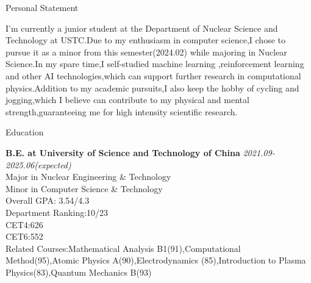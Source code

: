 \documentclass[
	11pt, %
]{resume} %
\begin{document}
\begin{rSection}{Personal Statement}

I'm currently a junior student at the Department of Nuclear Science and Technology at USTC.Due to 
my enthusiasm in computer science,I chose to pursue it as a minor from this
semester(2024.02) while majoring in Nuclear Science.In my spare time,I 
self-studied machine learning ,reinforcement learning and other AI technologies,which can 
support further research in computational physics.Addition to my academic pursuits,I also keep the hobby of cycling and 
jogging,which I believe can contribute to my physical and mental strength,guaranteeing me 
for high intensity scientific research.
\end{rSection}


\begin{rSection}{Education}
	
	\textbf{B.E. at University of Science and Technology of China} \hfill \textit{2021.09-2025.06(expected)} \\ 
	Major in Nuclear Engineering \& Technology \\
	Minor in Computer Science \& Technology \smallskip \\
	Overall GPA: 3.54/4.3\\
	Department Ranking:10/23\\
	CET4:626\\
	CET6:552\\
	Related Courses:Mathematical Analysis B1(91),Computational Method(95),Atomic Physics A(90),Electrodynamics
(85),\allowbreak Introduction to Plasma Physics(83),Quantum Mechanics B(93)
	
\end{rSection}

\end{document}

